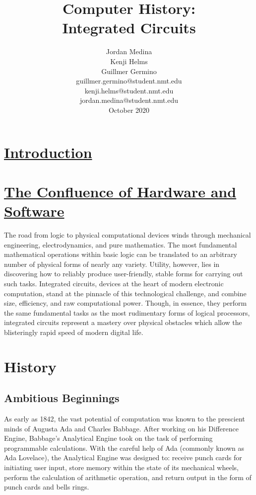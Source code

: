 \documentclass[letterpaper, 10 pt, conference]{IEEEconf}
\title{\LARGE \bf
Computer History:\\Integrated Circuits
}
\author{Jordan Medina\\Kenji Helms\\Guillmer Germino\\
\small guillmer.germino@student.nmt.edu\\
\small kenji.helms@student.nmt.edu\\
\small jordan.medina@student.nmt.edu\\
\small {October 2020}
}
\begin{document}
\maketitle

\section{\underline{Introduction}\\\\
\small {\underline{The Confluence of Hardware and Software}}}
The road from logic to physical computational devices winds through mechanical engineering, electrodynamics, and pure mathematics. The most fundamental mathematical operations within basic logic can be translated to an arbitrary number of physical forms of nearly any  variety. Utility, however, lies in discovering how to reliably produce user-friendly, stable forms for carrying out such tasks. Integrated circuits, devices at the heart of modern electronic computation, stand at the pinnacle of this technological challenge, and combine size, efficiency, and raw computational power. Though, in essence, they perform the same fundamental tasks as the most rudimentary forms of logical processors, integrated circuits represent a mastery over physical obstacles which allow the blisteringly rapid speed of modern digital life.


\section{History}
\subsection{Ambitious Beginnings}

As early as 1842, the vast potential of computation was known to the prescient minds of Augusta Ada and Charles Babbage. After working on his Difference Engine, Babbage's Analytical Engine took on the task of performing programmable calculations. With the careful help of Ada (commonly known as Ada Lovelace), the Analytical Engine was designed to: receive punch cards for initiating user input, store memory within the state of its mechanical wheels, perform the calculation of arithmetic operation, and return output in the form of punch cards and bells rings. 
\end{document}
